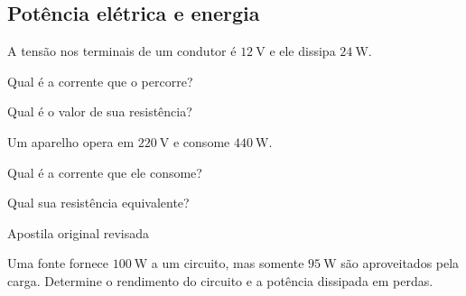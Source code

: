 
\subsection{Potência elétrica e energia}

\blocofixacao
\begin{questao}[1]{}

A tensão nos terminais de um condutor é $\SI{12}{\volt}$ e ele dissipa
$\SI{24}{\watt}$.
\begin{itensq}
\item Qual é a corrente que o percorre?
\item Qual é o valor de sua resistência?
\end{itensq}


\end{questao}
\begin{questao}[1]{}

Um aparelho opera em $\SI{220}{\volt}$ e consome $\SI{440}{\watt}$.
\begin{itensq}
\item Qual é a corrente que ele consome?
\item Qual sua resistência equivalente?
\end{itensq}


\end{questao}
\begin{questao}[1]{Apostila original revisada}

Uma fonte fornece $\SI{100}{\watt}$ a um circuito, mas somente
$\SI{95}{\watt}$ são aproveitados pela carga. Determine o rendimento do circuito
e a potência dissipada em perdas.


\end{questao}

